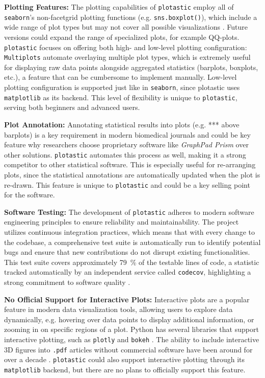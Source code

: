 \textbf{Plotting Features:} The plotting capabilities of \texttt{plotastic}
employ all of \texttt{seaborn}'s non-facetgrid plotting functions (e.g.
\texttt{sns.boxplot()}), which include a wide range of plot types but may not
cover all possible visualizations \cite{waskomSeabornStatisticalData2021}.
Future versions could expand the range of specialized plots, for example
QQ-plots. \texttt{plotastic} focuses on offering both high- and low-level
plotting configuration: \texttt{Multiplots} automate overlaying multiple plot
types, which is extremely useful for displaying raw data points alongside
aggregated statistics (barplots, boxplots, etc.), a feature that can be
cumbersome to implement manually. Low-level plotting configuration is supported
just like in \texttt{seaborn}, since plotastic uses \texttt{matplotlib} as its
backend. This level of flexibility is unique to \texttt{plotastic}, serving both
beginners and advanced users.

\textbf{Plot Annotation:} Annotating statistical results into plots (e.g. ***
above barplots) is a key requirement in modern biomedical journals and could be
key feature why researchers choose proprietary software like \textit{GraphPad
      Prism} over other solutions. \texttt{plotastic} automates this process as well,
making it a strong competitor to other statistical software. This is especially
useful for re-arranging plots, since the statistical annotations are
automatically updated when the plot is re-drawn. This feature is unique to
\texttt{plotastic} and could be a key selling point for the software.


\textbf{Software Testing:} The development of \texttt{plotastic} adheres to
modern software engineering principles to ensure reliability and
maintainability. The project utilizes continuous integration practices, which
means that with every change to the codebase, a comprehensive test suite is
automatically run to identify potential bugs and ensure that new contributions
do not disrupt existing functionalities. This test suite covers approximately
\SI{79}{\percent} of the testable lines of code, a statistic tracked
automatically by an independent service called \texttt{codecov}, highlighting a
strong commitment to software quality \cite{Codecov2024}.

\textbf{No Official Support for Interactive Plots:} Interactive plots are a popular feature
in modern data visualization tools, allowing users to explore data dynamically,
e.g. hovering over data points to display additional information, or zooming in
on specific regions of a plot. Python has several libraries that support
interactive plotting, such as \texttt{plotly} and \texttt{bokeh}
\cite{plotly,bokehdevelopmentteamBokehPythonLibrary2018}. The ability to include
interactive 3D figures into \texttt{.pdf} articles without commercial software
have been around for over a decade
\cite{barnesEmbeddingPublishingInteractive2013}. \texttt{plotastic} could
also support interactive plotting through its \texttt{matplotlib} backend,
but there are no plans to officially support this feature.

